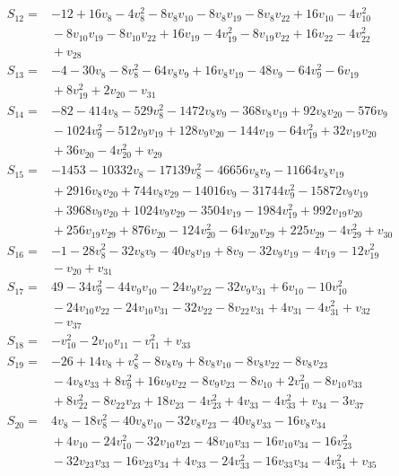 \documentclass[11pt]{article}
\begin{document}
\begin{align*}
S_{12}={}&-12+16v_{8}-4v_{8}^{2}-8v_{8}v_{10}-8v_{8}v_{19}-8v_{8}v_{22}+16v_{10}-4v_{10}^{2}\\
&{}-8v_{10}v_{19}-8v_{10}v_{22}+16v_{19}-4v_{19}^{2}-8v_{19}v_{22}+16v_{22}-4v_{22}^{2}\\
&{}+v_{28}\\
S_{13}={}&-4-30v_{8}-8v_{8}^{2}-64v_{8}v_{9}+16v_{8}v_{19}-48v_{9}-64v_{9}^{2}-6v_{19}\\
&{}+8v_{19}^{2}+2v_{20}-v_{31}\\
S_{14}={}&-82-414v_{8}-529v_{8}^{2}-1472v_{8}v_{9}-368v_{8}v_{19}+92v_{8}v_{20}-576v_{9}\\
&{}-1024v_{9}^{2}-512v_{9}v_{19}+128v_{9}v_{20}-144v_{19}-64v_{19}^{2}+32v_{19}v_{20}\\
&{}+36v_{20}-4v_{20}^{2}+v_{29}\\
S_{15}={}&-1453-10332v_{8}-17139v_{8}^{2}-46656v_{8}v_{9}-11664v_{8}v_{19}\\
&{}+2916v_{8}v_{20}+744v_{8}v_{29}-14016v_{9}-31744v_{9}^{2}-15872v_{9}v_{19}\\
&{}+3968v_{9}v_{20}+1024v_{9}v_{29}-3504v_{19}-1984v_{19}^{2}+992v_{19}v_{20}\\
&{}+256v_{19}v_{29}+876v_{20}-124v_{20}^{2}-64v_{20}v_{29}+225v_{29}-4v_{29}^{2}+v_{30}\\
S_{16}={}&-1-28v_{8}^{2}-32v_{8}v_{9}-40v_{8}v_{19}+8v_{9}-32v_{9}v_{19}-4v_{19}-12v_{19}^{2}\\
&{}-v_{20}+v_{31}\\
S_{17}={}&49-34v_{9}^{2}-44v_{9}v_{10}-24v_{9}v_{22}-32v_{9}v_{31}+6v_{10}-10v_{10}^{2}\\
&{}-24v_{10}v_{22}-24v_{10}v_{31}-32v_{22}-8v_{22}v_{31}+4v_{31}-4v_{31}^{2}+v_{32}\\
&{}-v_{37}\\
S_{18}={}&-v_{10}^{2}-2v_{10}v_{11}-v_{11}^{2}+v_{33}\\
S_{19}={}&-26+14v_{8}+v_{8}^{2}-8v_{8}v_{9}+8v_{8}v_{10}-8v_{8}v_{22}-8v_{8}v_{23}\\
&{}-4v_{8}v_{33}+8v_{9}^{2}+16v_{9}v_{22}-8v_{9}v_{23}-8v_{10}+2v_{10}^{2}-8v_{10}v_{33}\\
&{}+8v_{22}^{2}-8v_{22}v_{23}+18v_{23}-4v_{23}^{2}+4v_{33}-4v_{33}^{2}+v_{34}-3v_{37}\\
S_{20}={}&4v_{8}-18v_{8}^{2}-40v_{8}v_{10}-32v_{8}v_{23}-40v_{8}v_{33}-16v_{8}v_{34}\\
&{}+4v_{10}-24v_{10}^{2}-32v_{10}v_{23}-48v_{10}v_{33}-16v_{10}v_{34}-16v_{23}^{2}\\
&{}-32v_{23}v_{33}-16v_{23}v_{34}+4v_{33}-24v_{33}^{2}-16v_{33}v_{34}-4v_{34}^{2}+v_{35}\\

\end{align*}
\end{document}
